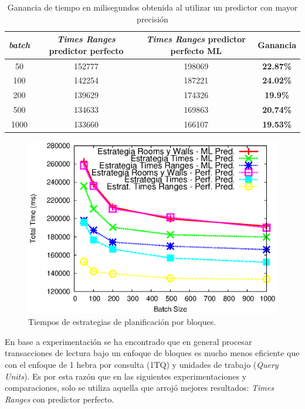 \begin{table}[htbp]
\caption{Ganancia de tiempo en milisegundos obtenida al utilizar un predictor con mayor precisión}
\begin{center}
\begin{tabular}{|c|c|c|c|}
\hline
\textit{batch} & \textit{Times Ranges} predictor perfecto & \textit{Times Ranges} predictor perfecto ML & Ganancia \\ \hline
50 & 152777 & 198069 & \textbf{22.87\%}   	\\ \hline
100 & 142254 & 187221 & \textbf{24.02\%}  	\\ \hline
200 & 139629 & 174326 & \textbf{19.9\%} 		\\ \hline
500 & 134633 & 169863 & \textbf{20.74\%} 	\\ \hline
1000 & 133660 & 166107 & \textbf{19.53\%} 	\\ \hline
\end{tabular}
\end{center}
\label{ganancia_predictor}
\end{table}

\begin{figure}[tp]
\centering
\includegraphics[scale=.75]{images/scheduler_all_16threads.eps}
\caption{Tiempos de estrategias de planificación por bloques.}
\label{fig:scheduler_all_16threads}
\end{figure}

En base a experimentación se ha encontrado que en general procesar transacciones de lectura bajo un enfoque de bloques \citep{Ye:2007} es mucho menos eficiente que con el enfoque de 1 hebra por consulta (1TQ) y unidades de trabajo (\textit{Query Units}). Es por esta razón que en las siguientes experimentaciones y comparaciones, solo se utiliza aquella que arrojó mejores resultados: \textit{Times Ranges} con predictor perfecto.

